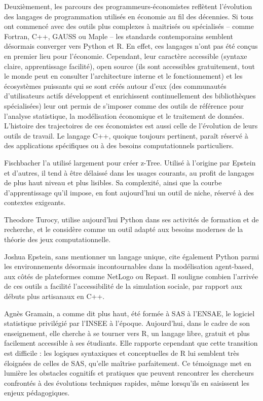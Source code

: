Deuxièmement, les parcours des programmeurs-économistes reflètent l’évolution des langages de programmation utilisés en économie au fil des décennies. Si tous ont commencé avec des outils plus complexes à maitrisés ou spécialisés – comme Fortran, C++, GAUSS ou Maple – les standards contemporains semblent désormais converger vers Python et R. En effet, ces langages n'ont pas été conçus en premier lieu pour l'économie. Cependant, leur caractère accessible (syntaxe claire, apprentissage facilité), open source (ils sont accessibles gratuitement, tout le monde peut en consulter l'architecture interne et le fonctionnement) et les écosystèmes puissants qui se sont créés autour d'eux (des communautés d'utilisateurs actifs développent et enrichissent continuellement des bibliothèques spécialisées) leur ont permis de s'imposer comme des outils de référence pour l’analyse statistique, la modélisation économique et le traitement de données. L’histoire des trajectoires de ces économistes est aussi celle de l’évolution de leurs outils de travail. Le langage C++, quoique toujours pertinent, paraît réservé à des applications spécifiques ou à des besoins computationnels particuliers. 

Fischbacher l’a utilisé largement pour créer z-Tree. Utilisé à l’origine par Epstein et d’autres, il tend à être délaissé dans les usages courants, au profit de langages de plus haut niveau et plus lisibles. Sa complexité, ainsi que la courbe d’apprentissage qu’il impose, en font aujourd’hui un outil de niche, réservé à des contextes exigeants. 

Theodore Turocy, utilise aujourd’hui Python dans ses activités de formation et de recherche, et le considère comme un outil adapté aux besoins modernes de la théorie des jeux computationnelle. 

Joshua Epstein, sans mentionner un langage unique, cite également Python parmi les environnements désormais incontournables dans la modélisation agent-based, aux côtés de plateformes comme NetLogo ou Repast. Il souligne combien l’arrivée de ces outils a facilité l’accessibilité de la simulation sociale, par rapport aux débuts plus artisanaux en C++. 

Agnès Gramain, a comme dit plus haut, été formée à SAS à l’ENSAE, le logiciel statistique privilégié par l’INSEE à l’époque. Aujourd’hui, dans le cadre de son enseignement, elle cherche à se tourner vers R, un langage libre, gratuit et plus facilement accessible à ses étudiants. Elle rapporte cependant que cette transition est difficile : les logiques syntaxiques et conceptuelles de R lui semblent très éloignées de celles de SAS, qu’elle maîtrise parfaitement. Ce témoignage met en lumière les obstacles cognitifs et pratiques que peuvent rencontrer les chercheurs confrontés à des évolutions techniques rapides, même lorsqu’ils en saisissent les enjeux pédagogiques. 

